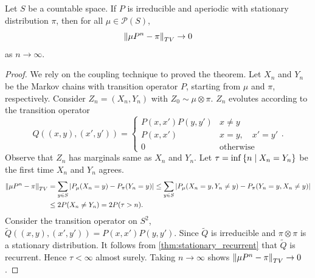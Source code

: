 \begin{theorem}
    Let $S$ be a countable space. If $P$ is irreducible and aperiodic with 
    stationary distribution $\pi$, then for all $\mu\in \mathcal{P}(S)$, 
    \begin{equation*}
        \left\lVert {\mu P^n - \pi} \right\rVert_{TV}\to 0
    \end{equation*} 
    as $n\to\infty$. 
\end{theorem}
\begin{proof}
    We rely on the coupling technique to proved the theorem. Let $X_n$ and 
    $Y_n$ be the Markov chains with transition operator $P$, starting 
    from $\mu$ and $\pi$, respectively. Consider $Z_n = (X_n,Y_n)$ with 
    $Z_0\sim \mu\otimes\pi$. $Z_n$ evolutes according to the transition 
    operator 
    \begin{equation*}
        Q((x,y), (x',y')) = \begin{cases}
            P(x,x')P(y,y') & x\neq y \\ 
            P(x,x') & x = y,\quad x' = y' \\ 
            0 & \text{otherwise}
        \end{cases}.
    \end{equation*} 
    Observe that $Z_n$ has marginals same as $X_n$ and $Y_n$. Let 
    $\tau = \inf\left\{ n \;\middle\vert\; X_n = Y_n \right\}$ be the first time $X_n$ and $Y_n$ 
    agrees. 
    \begin{equation*}
        \begin{split}
            \left\lVert {\mu P^n - \pi} \right\rVert_{TV} &= \sum_{y\in S}\left\lvert {P_\mu(X_n = y) - P_\pi(Y_n = y)} \right\rvert 
            \leq \sum_{y\in S} \left\lvert {P_\mu(X_n = y, Y_n\neq y) - P_\pi(Y_n = y, X_n\neq y)} \right\rvert \\
            &\leq 2P(X_n\neq Y_n) = 2P(\tau > n). 
        \end{split}
    \end{equation*}
    Consider the transition operator on $S^2$, $\tilde{Q}((x,y), (x',y')) = P(x,x')P(y,y')$. 
    Since $\tilde{Q}$ is irreducible and $\pi\otimes\pi$ is a stationary 
    distribution. It follows from \cref{thm:stationary_recurrent} that 
    $\tilde{Q}$ is recurrent. Hence $\tau < \infty$ almost surely. 
    Taking $n\to\infty$ shows $\left\lVert {\mu P^n - \pi} \right\rVert_{TV} \to 0$. 
\end{proof}

